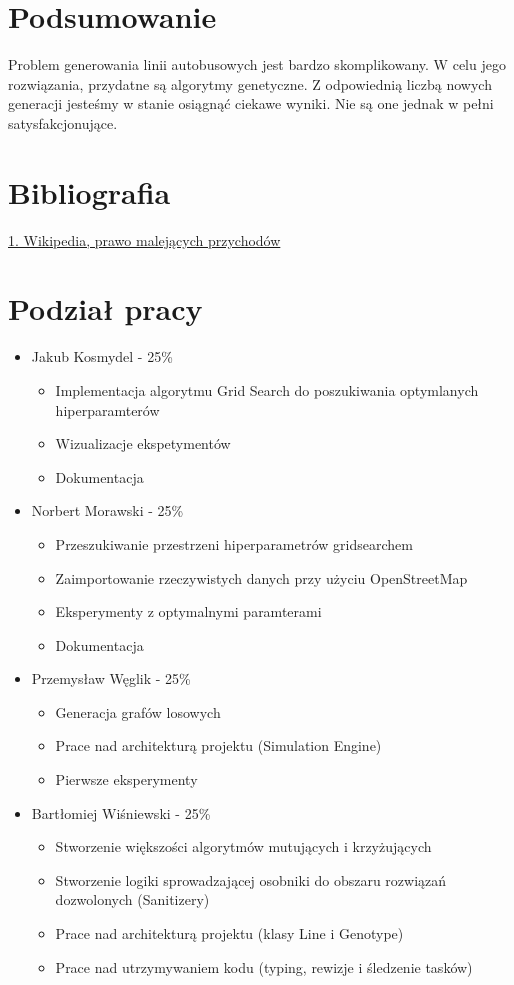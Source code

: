 \documentclass[12pt,a4paper,openright]{mwrep}
\begin{document}
\chapter{Podsumowanie}

Problem generowania linii autobusowych jest bardzo skomplikowany. W celu jego rozwiązania, przydatne są algorytmy genetyczne. Z odpowiednią liczbą nowych generacji jesteśmy w stanie osiągnąć ciekawe wyniki. Nie są one jednak w pełni satysfakcjonujące.

\chapter{Bibliografia}
\href{https://pl.wikipedia.org/wiki/Prawo_malej%C4%85cych_przychod%C3%B3w}{1. Wikipedia, prawo malejących przychodów}


\chapter{Podział pracy}
\begin{itemize}
    \item Jakub Kosmydel - 25\%
    \begin{itemize}
        \item Implementacja algorytmu Grid Search do poszukiwania optymlanych hiperparamterów
        \item Wizualizacje ekspetymentów
        \item Dokumentacja
    \end{itemize}
    \item Norbert Morawski - 25\%
    \begin{itemize}
        \item Przeszukiwanie przestrzeni hiperparametrów gridsearchem
        \item Zaimportowanie rzeczywistych danych przy użyciu OpenStreetMap
        \item Eksperymenty z optymalnymi paramterami
        \item Dokumentacja
    \end{itemize}
    \item Przemysław Węglik - 25\%
    \begin{itemize}
        \item Generacja grafów losowych
        \item Prace nad architekturą projektu (Simulation Engine)
        \item Pierwsze eksperymenty
    \end{itemize}
    \item Bartłomiej Wiśniewski - 25\%
    \begin{itemize}
        \item Stworzenie większości algorytmów mutujących i krzyżujących
        \item Stworzenie logiki sprowadzającej osobniki do obszaru rozwiązań dozwolonych (Sanitizery)
        \item Prace nad architekturą projektu (klasy Line i Genotype)
        \item Prace nad utrzymywaniem kodu (typing, rewizje i śledzenie tasków)
    \end{itemize}
\end{itemize}
\end{document}
